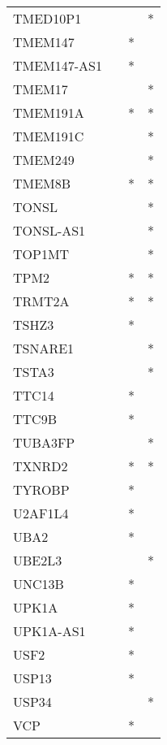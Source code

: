 \begin{longtable}{lccc}
TMED10P1     &           &     &       * \\
TMEM147      &           &   * &         \\
TMEM147-AS1  &           &   * &         \\
TMEM17       &           &     &       * \\
TMEM191A     &           &   * &       * \\
TMEM191C     &           &     &       * \\
TMEM249      &           &     &       * \\
TMEM8B       &           &   * &       * \\
TONSL        &           &     &       * \\
TONSL-AS1    &           &     &       * \\
TOP1MT       &           &     &       * \\
TPM2         &           &   * &       * \\
TRMT2A       &           &   * &       * \\
TSHZ3        &           &   * &         \\
TSNARE1      &           &     &       * \\
TSTA3        &           &     &       * \\
TTC14        &           &   * &         \\
TTC9B        &           &   * &         \\
TUBA3FP      &           &     &       * \\
TXNRD2       &           &   * &       * \\
TYROBP       &           &   * &         \\
U2AF1L4      &           &   * &         \\
UBA2         &           &   * &         \\
UBE2L3       &           &     &       * \\
UNC13B       &           &   * &         \\
UPK1A        &           &   * &         \\
UPK1A-AS1    &           &   * &         \\
USF2         &           &   * &         \\
USP13        &           &   * &         \\
USP34        &           &     &       * \\
VCP          &           &   * &         \\

\end{longtable}
